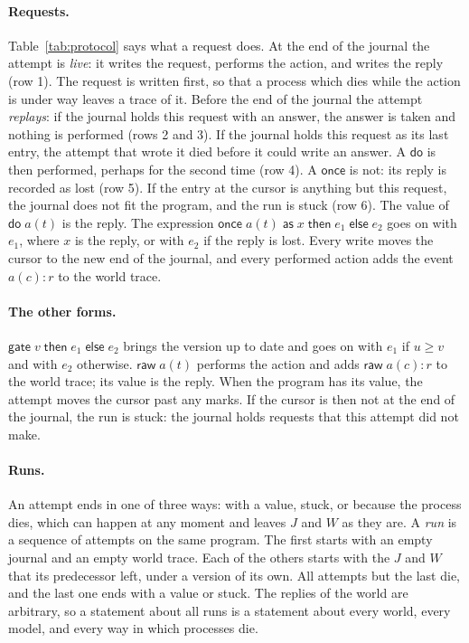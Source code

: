 \documentclass[acmsmall,nonacm,screen]{acmart}
\newcommand{\kw}[1]{\mathsf{#1}}
\newcommand{\once}[5]{\kw{once}\;#1(#2)\;\kw{as}\;#3\;\kw{then}\;#4\;\kw{else}\;#5}
\newcommand{\gate}[3]{\kw{gate}\;#1\;\kw{then}\;#2\;\kw{else}\;#3}
\begin{document}
\paragraph{Requests.} Table~\ref{tab:protocol} says what a request does. At the end of the
journal the attempt is \emph{live}: it writes the request, performs the action, and writes the
reply (row 1). The request is written first, so that a process which dies while the action is
under way leaves a trace of it. Before the end of the journal the attempt \emph{replays}: if
the journal holds this request with an answer, the answer is taken and nothing is performed
(rows 2 and 3). If the journal holds this request as its last entry, the attempt that wrote
it died before it could write an answer. A $\kw{do}$ is then performed, perhaps for the
second time (row 4). A $\kw{once}$ is not: its reply is recorded as lost (row 5). If the
entry at the cursor is anything but this request, the journal does not fit the program, and
the run is stuck (row 6). The value of $\kw{do}\;a(t)$ is the reply. The expression
$\once{a}{t}{x}{e_1}{e_2}$ goes on with $e_1$, where $x$ is the reply, or with $e_2$ if the
reply is lost. Every write moves the cursor to the new end of the journal, and every
performed action adds the event $a(c){:}r$ to the world trace.

\paragraph{The other forms.} $\gate{v}{e_1}{e_2}$ brings the version up to date and goes on
with $e_1$ if $u \ge v$ and with $e_2$ otherwise. $\kw{raw}\;a(t)$ performs the action and
adds $\kw{raw}\;a(c){:}r$ to the world trace; its value is the reply. When the program has
its value, the attempt moves the cursor past any marks. If the cursor is then not at the end
of the journal, the run is stuck: the journal holds requests that this attempt did not make.

\paragraph{Runs.} An attempt ends in one of three ways: with a value, stuck, or because the
process dies, which can happen at any moment and leaves $J$ and $W$ as they are. A \emph{run}
is a sequence of attempts on the same program. The first starts with an empty journal and an
empty world trace. Each of the others starts with the $J$ and $W$ that its predecessor left,
under a version of its own. All attempts but the last die, and the last one ends with a value
or stuck. The replies of the world are arbitrary, so a statement about all runs is a
statement about every world, every model, and every way in which processes die.
\end{document}
